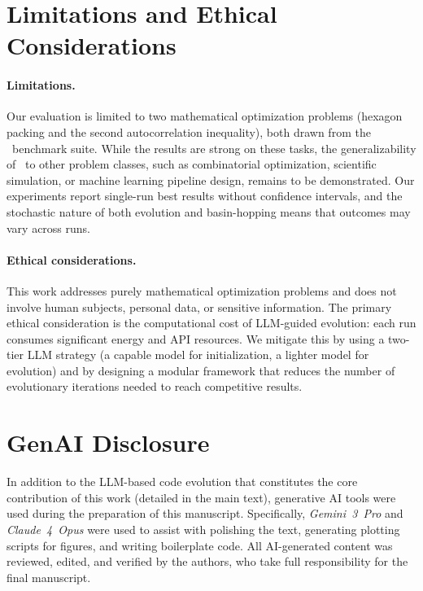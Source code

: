 \documentclass[sigconf]{acmart}
\begin{document}
\section*{Limitations and Ethical Considerations}
\paragraph{Limitations.}
Our evaluation is limited to two mathematical optimization problems (hexagon packing and the second autocorrelation inequality), both drawn from the \alphaevolve\ benchmark suite. While the results are strong on these tasks, the generalizability of \improvevolve\ to other problem classes, such as combinatorial optimization, scientific simulation, or machine learning pipeline design, remains to be demonstrated. Our experiments report single-run best results without confidence intervals, and the stochastic nature of both evolution and basin-hopping means that outcomes may vary across runs.

\paragraph{Ethical considerations.}
This work addresses purely mathematical optimization problems and does not involve human subjects, personal data, or sensitive information. The primary ethical consideration is the computational cost of LLM-guided evolution: each run consumes significant energy and API resources. We mitigate this by using a two-tier LLM strategy (a capable model for initialization, a lighter model for evolution) and by designing a modular framework that reduces the number of evolutionary iterations needed to reach competitive results.

\section*{GenAI Disclosure}
In addition to the LLM-based code evolution that constitutes the core contribution of this work (detailed in the main text), generative AI tools were used during the preparation of this manuscript. Specifically, \emph{Gemini~3~Pro} and \emph{Claude~4~Opus} were used to assist with polishing the text, generating plotting scripts for figures, and writing boilerplate code. All AI-generated content was reviewed, edited, and verified by the authors, who take full responsibility for the final manuscript.



\end{document}
